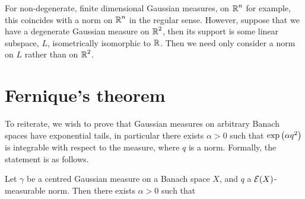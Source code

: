\documentclass[../main.tex]{subfiles}
\begin{document}
For non-degenerate, finite dimensional Gaussian measures, on $\operatorname{\mathbb{R}}^n$ for example, this coincides with a norm on $\operatorname{\mathbb{R}}^n$ in the regular sense. However, suppose that we have a degenerate Gaussian measure on $\operatorname{\mathbb{R}}^2$, then its support is some linear subspace, $L$, isometrically isomorphic to $\operatorname{\mathbb{R}}$. Then we need only consider a norm on $L$ rather than on $\operatorname{\mathbb{R}}^2$.

\section{Fernique's theorem}

To reiterate, we wish to prove that Gaussian measures on arbitrary Banach spaces have exponential tails, in particular there exists $\alpha>0$ such that $\exp\del{\alpha q^2}$ is integrable with respect to the measure, where $q$ is a norm. Formally, the statement is as follows.
\begin{theorem}
\label{the:fernique}
Let $\gamma$ be a centred Gaussian measure on a Banach space $X$, and $q$ a $\mathcal{E}(X)$-measurable norm. Then there exists $\alpha>0$ such that 
\end{theorem}
\end{document}
